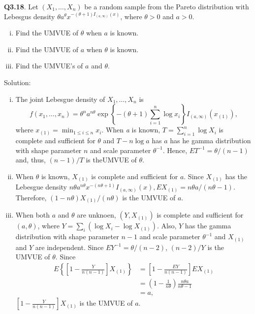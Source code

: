\documentclass{article}
\newcommand{\tmtextbf}[1]{{\bfseries{#1}}}
\newcommand{\tmtextit}[1]{{\itshape{#1}}}
\newenvironment{enumerateroman}{\begin{enumerate}[i.] }{\end{enumerate}}
\begin{document}
\begin{CJK*}{UTF8}{gbsn}

\tmtextbf{Q3.18}. Let $(X_1, \ldots, X_n)$ be a random sample from the Pareto
distribution with Lebesgus density $\theta a^{\theta} x^{- (\theta + 1) I_{(a,
\infty)} (x)}$, where $\theta > 0$ and $a > 0$.
\begin{enumerateroman}
  \item Find the UMVUE of $\theta$ when $a$ is known.
  
  \item Find the UMVUE of $a$ when $\theta$ is known.
  
  \item Find the UMVUE's of $a$ and $\theta$.
\end{enumerateroman}
Solution:
\begin{enumerateroman}
  \item The joint Lebesgue density of $X_1, \ldots, X_n$ is
  \[ f (x_1, \ldots, x_n) = \theta^n a^{n \theta} \exp \left\{ - (\theta + 1)
     \sum_{i = 1}^n \log x_i \right\} I_{(a, \infty)} (x_{(1)}), \]
  where $x_{(1)} = \min_{1 \leqslant i \leqslant n} x_i$. When \tmtextit{a} is
  known, $T = \sum_{i = 1}^n \log X_i$ is complete and sufficient for $\theta$
  and $T - n \log a$ has $a$ has he gamma distribution with shape parameter
  $n$ and scale parameter $\theta^{- 1}$. Hence, $E T^{- 1} = \theta / (n -
  1)$ and, thus, $(n - 1) / T$ is theUMVUE of $\theta$.
  
  \item When $\theta$ is known, $X_{(1)}$ is complete and sufficient for $a.$
  Since $X_{(1)}$ has the Lebesgue density $n \theta a^{n \theta} x^{- (n
  \theta + 1)} I_{(a, \infty)} (x), E X_{(1)} = n \theta a / (n \theta - 1) .$
  Therefore, $(1 - n \theta) X_{(1)} / (n \theta)$ is the UMVUE of $a$.
  
  \item When both $a$ and $\theta$ are unknoen, $(Y, X_{(1)})$ is complete and
  sufficient for $(a, \theta)$, where $Y = \sum_i (\log X_i - \log X_{(1)})$.
  Also, $Y$ has the gamma distribution with shape parameter $n - 1$ and scale
  parameter $\theta^{- 1}$ and $X_{(1)}$ and $Y$ are independent. Since $E
  Y^{- 1} = \theta / (n - 2)$, $(n - 2) / Y$ is the UMVUE of $\theta$. Since
  \[ \  \]
  \[ \begin{array}{ll}
       E \left\{ \left[ 1 - \frac{Y}{n (n - 1)} \right] X_{(1)} \right\} & =
       \left[ 1 - \frac{E Y}{n (n - 1)} \right] E X_{(1)}\\
       & = \left( 1 - \frac{1}{n \theta} \right) \frac{n \theta a}{n \theta -
       1}\\
       & = a,
     \end{array} \]
  $\left[ 1 - \frac{Y}{n (n - 1)} \right] X_{(1)}$ is the UMVUE of $a$.
\end{enumerateroman}

\end{CJK*}
\end{document}
